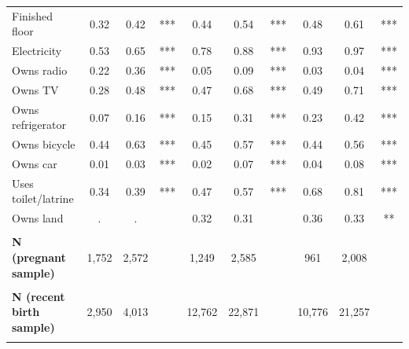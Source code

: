 \begin{tabular}{lccccccccc}
Finished floor&0.32&0.42&***&0.44&0.54&***&0.48&0.61&***\\
Electricity&0.53&0.65&***&0.78&0.88&***&0.93&0.97&***\\
Owns radio&0.22&0.36&***&0.05&0.09&***&0.03&0.04&***\\
Owns TV&0.28&0.48&***&0.47&0.68&***&0.49&0.71&***\\
Owns refrigerator&0.07&0.16&***&0.15&0.31&***&0.23&0.42&***\\
Owns bicycle&0.44&0.63&***&0.45&0.57&***&0.44&0.56&***\\
Owns car&0.01&0.03&***&0.02&0.07&***&0.04&0.08&***\\
Uses toilet/latrine&0.34&0.39&***&0.47&0.57&***&0.68&0.81&***\\
Owns land&.&.&&0.32&0.31&&0.36&0.33&**\\
&&&&&&&&&\\
\textbf{N (pregnant sample)}&1,752&2,572&&1,249&2,585&&961&2,008&\\
&&&&&&&&&\\
\textbf{N (recent birth sample)}&2,950&4,013&&12,762&22,871&&10,776&21,257&\\
&&&&&&&&&\\
\bottomrule
\end{tabular}
